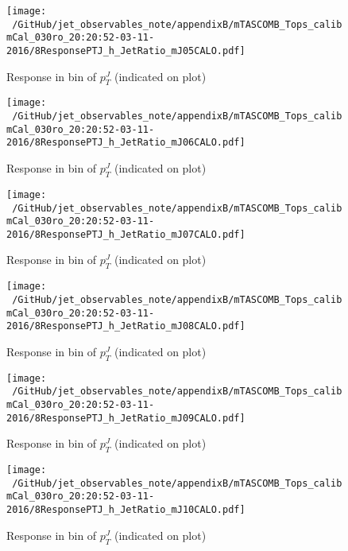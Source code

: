 \begin{figure}

\texttt{[image: ~/GitHub/jet\_observables\_note/appendixB/mTASCOMB\_Tops\_calibmCal\_030ro\_20:20:52-03-11-2016/8ResponsePTJ\_h\_JetRatio\_mJ05CALO.pdf]}
\caption{Response in bin of  $p_{T}^{J}$ (indicated on plot)} 

\end{figure}

\begin{figure}

\texttt{[image: ~/GitHub/jet\_observables\_note/appendixB/mTASCOMB\_Tops\_calibmCal\_030ro\_20:20:52-03-11-2016/8ResponsePTJ\_h\_JetRatio\_mJ06CALO.pdf]}
\caption{Response in bin of  $p_{T}^{J}$ (indicated on plot)} 

\end{figure}

%
\begin{figure}

\texttt{[image: ~/GitHub/jet\_observables\_note/appendixB/mTASCOMB\_Tops\_calibmCal\_030ro\_20:20:52-03-11-2016/8ResponsePTJ\_h\_JetRatio\_mJ07CALO.pdf]}
\caption{Response in bin of  $p_{T}^{J}$ (indicated on plot)} 

\end{figure}


\begin{figure}

\texttt{[image: ~/GitHub/jet\_observables\_note/appendixB/mTASCOMB\_Tops\_calibmCal\_030ro\_20:20:52-03-11-2016/8ResponsePTJ\_h\_JetRatio\_mJ08CALO.pdf]}
\caption{Response in bin of  $p_{T}^{J}$ (indicated on plot)} 

\end{figure}

\begin{figure}

\texttt{[image: ~/GitHub/jet\_observables\_note/appendixB/mTASCOMB\_Tops\_calibmCal\_030ro\_20:20:52-03-11-2016/8ResponsePTJ\_h\_JetRatio\_mJ09CALO.pdf]}
\caption{Response in bin of  $p_{T}^{J}$ (indicated on plot)} 

\end{figure}

\begin{figure}

\texttt{[image: ~/GitHub/jet\_observables\_note/appendixB/mTASCOMB\_Tops\_calibmCal\_030ro\_20:20:52-03-11-2016/8ResponsePTJ\_h\_JetRatio\_mJ10CALO.pdf]}
\caption{Response in bin of  $p_{T}^{J}$ (indicated on plot)} 

\end{figure}

